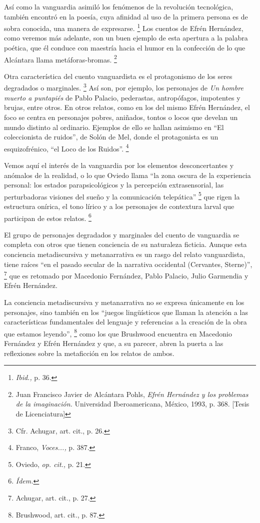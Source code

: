 \documentclass[14pt,twoside,final]{extbook} %
\let\oldfootnote\footnote
\renewcommand\footnote[1]{%
\oldfootnote{\hspace{1mm}#1}}
\begin{document}
Así como la vanguardia asimiló los fenómenos de la revolución tecnológica, también encontró en la poesía, cuya afinidad al uso de la primera persona es de sobra conocida, una manera de expresarse.\footnote{\emph{Ibid.,} p. 36.} Los cuentos de Efrén Hernández, como veremos más adelante, son un buen ejemplo de esta apertura a la palabra poética, que él conduce con maestría hacia el humor en la confección de lo que Alcántara llama metáforas-bromas.\footnote{Juan Francisco Javier de Alcántara Pohls, \emph{Efrén Hernández y los problemas de la imaginación.} Universidad Iberoamericana, México, 1993, p. 368. [Tesis de Licenciatura]}

Otra característica del cuento vanguardista es el protagonismo de los seres degradados o marginales.\footnote{Cfr. Achugar, art. cit., p. 26.} Así son, por ejemplo, los personajes de \emph{Un hombre muerto a puntapiés} de Pablo Palacio, pederastas, antropófagos, impotentes y brujas, entre otros. En otros relatos, como en los del mismo Efrén Hernández, el foco se centra en personajes pobres, aniñados, tontos o locos que develan un mundo distinto al ordinario. Ejemplos de ello se hallan asimismo en ``El coleccionista de ruidos'', de Solón de Mel, donde el protagonista es un esquizofrénico, ``el Loco de los Ruidos''.\footnote{Franco, \emph{Voces...,} p. 387.}

Vemos aquí el interés de la vanguardia por los elementos desconcertantes y anómalos de la realidad, o lo que Oviedo llama ``la zona oscura de la experiencia personal: los estados parapsicológicos y la percepción extrasensorial, las perturbadoras visiones del sueño y la comunicación telepática''\footnote{Oviedo, \emph{op. cit.,} p. 21.} que rigen la estructura onírica, el tono lírico y a los personajes de contextura larval que participan de estos relatos.\footnote{\em Ídem.}

El grupo de personajes degradados y marginales del cuento de vanguardia se completa con otros que tienen conciencia de su naturaleza ficticia. Aunque esta conciencia metadiscursiva y metanarrativa es un rasgo del relato vanguardista, tiene raíces ``en el pasado secular de la narrativa occidental (Cervantes, Sterne)'',\footnote{Achugar, art. cit., p. 27.} que es retomado por Macedonio Fernández, Pablo Palacio, Julio Garmendia y Efrén Hernández.

La conciencia metadiscursiva y metanarrativa no se expresa únicamente en los personajes, sino también en los ``juegos lingüísticos que llaman la atención a las características fundamentales del lenguaje
y referencias a la creación de la obra que estamos leyendo'',\footnote{Brushwood, art. cit., p. 87.} como los que Brushwood encuentra en Macedonio Fernández y Efrén Hernández y que, a su parecer, abren la puerta a las reflexiones sobre la metaficción en los relatos de ambos.
\end{document}
